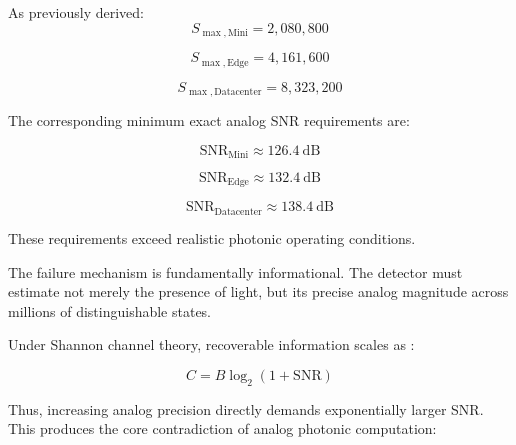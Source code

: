 \documentclass[journal]{IEEEtran}
\begin{document}
As previously derived:
\begin{equation}
S_{\max, \mathrm{Mini}} = 2,080,800
\end{equation}

\begin{equation}
S_{\max, \mathrm{Edge}} = 4,161,600
\end{equation}

\begin{equation}
S_{\max, \mathrm{Datacenter}} = 8,323,200
\end{equation}

The corresponding minimum exact analog SNR requirements are:

\begin{equation}
\mathrm{SNR}_{\mathrm{Mini}} \approx 126.4~\mathrm{dB}
\end{equation}

\begin{equation}
\mathrm{SNR}_{\mathrm{Edge}} \approx 132.4~\mathrm{dB}
\end{equation}

\begin{equation}
\mathrm{SNR}_{\mathrm{Datacenter}} \approx 138.4~\mathrm{dB}
\end{equation}

These requirements exceed realistic photonic operating conditions.

The failure mechanism is fundamentally informational. The detector must estimate not merely the presence of light, but its precise analog magnitude across millions of distinguishable states.

Under Shannon channel theory, recoverable information scales as \cite{Winzer2006}\cite{Saleh2019}:

\begin{equation}
C = B\log_{2}\left(1 + \mathrm{SNR}\right)
\end{equation}

Thus, increasing analog precision directly demands exponentially larger SNR. This produces the core contradiction of analog photonic
computation:

\begin{center}
\end{center}
\end{document}
